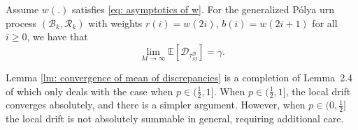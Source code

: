 \documentclass[EJP]{ejpecp} %
\begin{document}
\begin{lemma} \label{lm: convergence of mean of discrepancies}
	Assume $w(.)$ satisfies \eqref{eq: asymptotics of w}.
	For the generalized P\'{o}lya urn process $(\mathcal{B}_{k},\mathcal{R}_{k})$ with weights $r(i)= w(2i)$, $b(i) = w(2i+1)$ for all $i\geq 0$, we have that
	$$
	\lim_{M\to\infty} \mathbb{E}[\mathcal{D}_{\tau_M^{\mathcal{B}}}] = \gamma. 
	$$
\end{lemma} 
\begin{remark}
	Lemma \ref{lm: convergence of mean of discrepancies} is a completion of Lemma~2.4 of \cite{KMP23} which only deals with the case when ${p \in (\frac{1}{2}, 1]}$. When $p \in (\frac{1}{2}, 1]$, the local drift converges absolutely, and there is a simpler argument. However, when $p \in (0,\frac{1}{2}]$ the local drift is not absolutely summable in general, requiring additional care.
\end{remark}
\end{document}
